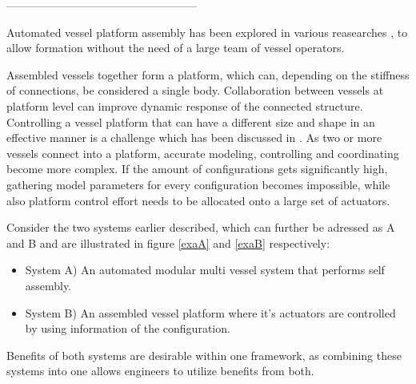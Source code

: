 ---------------------------------------------------

Automated vessel platform assembly has been explored in various reasearches
\cite{mateos2019autonomous} %
\cite{o2014self} %
\cite{paulos2015automated} %
, to allow formation without the need of a large team of vessel operators. 

Assembled vessels together form a platform, which can, depending on the stiffness of connections, be considered a single body. Collaboration between vessels at platform level can improve dynamic response of the connected structure. Controlling a vessel platform that can have a different size and shape in an effective manner is a challenge which has been discussed in \cite{park2019coordinated} \cite{kayacan2019learning}. As two or more vessels connect into a platform, accurate modeling, controlling and coordinating become more complex. If the amount of configurations gets significantly high, gathering model parameters for every configuration becomes impossible, while also platform control effort needs to be allocated onto a large set of actuators. 

Consider the two systems earlier described, which can further be adressed as A and B and are illustrated in figure \ref{exaA} and \ref{exaB} respectively:
\begin{itemize}
	\item System A) An automated modular multi vessel system that performs self assembly.
	\item System B) An assembled vessel platform where it's actuators are controlled by using information of the configuration.
\end{itemize}

Benefits of both systems are desirable within one framework, as combining these systems into one allows engineers to utilize benefits from both. 

